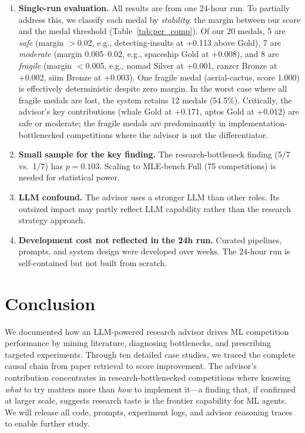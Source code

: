 \documentclass{article}
\begin{document}
\begin{enumerate}[leftmargin=1.5em,itemsep=2pt]
    \item \textbf{Single-run evaluation.} All results are from one 24-hour run. To partially address this, we classify each medal by \emph{stability}: the margin between our score and the medal threshold (Table~\ref{tab:per_comp}). Of our 20 medals, 5 are \emph{safe} (margin $>$0.02, e.g., detecting-insults at +0.113 above Gold), 7 are \emph{moderate} (margin 0.005--0.02, e.g., spaceship Gold at +0.008), and 8 are \emph{fragile} (margin $<$0.005, e.g., nomad Silver at +0.001, ranzcr Bronze at +0.002, siim Bronze at +0.003). One fragile medal (aerial-cactus, score 1.000) is effectively deterministic despite zero margin. In the worst case where all fragile medals are lost, the system retains 12 medals (54.5\%). Critically, the advisor's key contributions (whale Gold at +0.171, aptos Gold at +0.012) are safe or moderate; the fragile medals are predominantly in implementation-bottlenecked competitions where the advisor is not the differentiator.
    \item \textbf{Small sample for the key finding.} The research-bottleneck finding (5/7 vs.\ 1/7) has $p = 0.103$. Scaling to MLE-bench Full (75 competitions) is needed for statistical power.
    \item \textbf{LLM confound.} The advisor uses a stronger LLM than other roles. Its outsized impact may partly reflect LLM capability rather than the research strategy approach.
    \item \textbf{Development cost not reflected in the 24h run.} Curated pipelines, prompts, and system design were developed over weeks. The 24-hour run is self-contained but not built from scratch.
\end{enumerate}

\section{Conclusion}
\label{sec:conclusion}

We documented how an LLM-powered research advisor drives ML competition performance by mining literature, diagnosing bottlenecks, and prescribing targeted experiments. Through ten detailed case studies, we traced the complete causal chain from paper retrieval to score improvement. The advisor's contribution concentrates in research-bottlenecked competitions where knowing \emph{what} to try matters more than \emph{how} to implement it---a finding that, if confirmed at larger scale, suggests research taste is the frontier capability for ML agents. We will release all code, prompts, experiment logs, and advisor reasoning traces to enable further study.
\end{document}
